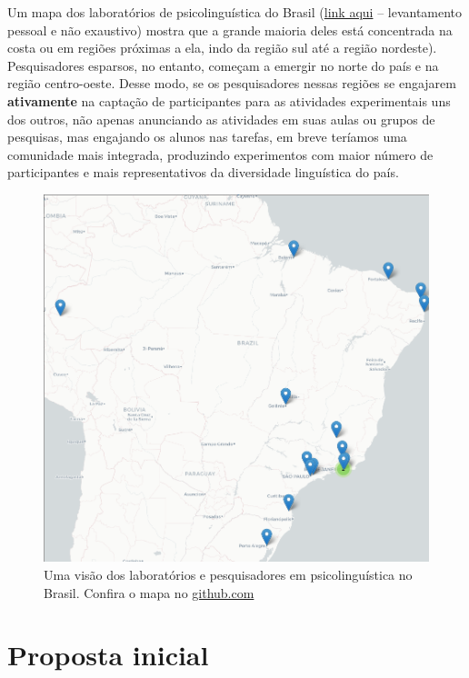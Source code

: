 \documentclass[11pt]{article}
\begin{document}
Um mapa dos laboratórios de psicolinguística do Brasil (\href{https://igordeo-costa.github.io/about/}{link aqui} – levantamento pessoal e não exaustivo) mostra que a grande maioria deles está concentrada na costa ou em regiões próximas a ela, indo da região sul até a região nordeste). Pesquisadores esparsos, no entanto, começam a emergir no norte do país e na região centro-oeste. Desse modo, se os pesquisadores nessas regiões se engajarem \textbf{ativamente} na captação de participantes para as atividades experimentais uns dos outros, não apenas anunciando as atividades em suas aulas ou grupos de pesquisas, mas engajando os alunos nas tarefas, em breve teríamos uma comunidade mais integrada, produzindo experimentos com maior número de participantes e mais representativos da diversidade linguística do país.

\begin{figure}[htbp]
\centering
\includegraphics[width=.9\linewidth]{./img/labs-do-brasil.png}
\caption{Uma visão dos laboratórios e pesquisadores em psicolinguística no Brasil. Confira o mapa no \href{https://igordeo-costa.github.io/about/}{github.com}}
\end{figure}

\section{Proposta inicial}
\label{sec:orgafc0a60}
\end{document}
